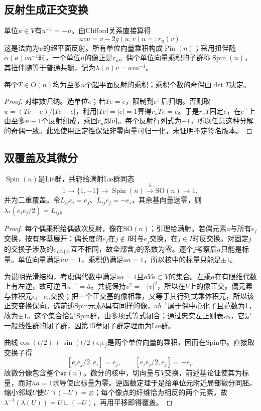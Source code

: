 \subsection{反射生成正交变换}
单位$u\in V$有$u^{-1}=-u$。由Clifford关系直接算得
\[
 uvu=v-2g(u,v)u=:r_u(v).
\]
这是法向为$u$的超平面反射。所有单位向量乘积构成$\operatorname{Pin}(n)$；采用扭伴随$\alpha(a)va^{-1}$时，一个单位$u$的像正是$r_u$。偶个单位向量乘积的子群称$\operatorname{Spin}(n)$，其扭伴随等于普通共轭，记为$\lambda(a)v=ava^{-1}$。

\begin{lemma}[正定反射分解]\label{lem:euclidean-reflections}
每个$T\in\mathrm O(n)$均为至多$n$个超平面反射的乘积；乘积个数的奇偶由$\det T$决定。
\end{lemma}
\begin{proof}
对维数归纳。选单位$e$；若$Te=e$，限制到$e^\perp$后归纳。否则取$u=(Te-e)/|Te-e|$，利用$|Te|=|e|=1$算得$r_uTe=e$。于是$r_uT$固定$e$，在$e^\perp$上由至多$n-1$个反射组成，乘回$r_u$即可。每个反射行列式为$-1$，所以任意这种分解的奇偶一致。此处使用正定性保证非零向量可归一化，未证明不定签名版本。
\end{proof}

\subsection{双覆盖及其微分}
\begin{theorem}\label{thm:spin-cover}
$\operatorname{Spin}(n)$是Lie群，共轭给满射Lie群同态
\[
 1\longrightarrow\{1,-1\}\longrightarrow\operatorname{Spin}(n)
 \xrightarrow{\lambda}\mathrm{SO}(n)\longrightarrow1,
\]
并为二重覆盖。令$L_{ij}e_i=e_j$、$L_{ij}e_j=-e_i$，其余基向量送零，则$\lambda_*(e_ie_j/2)=L_{ij}$。
\end{theorem}
\begin{proof}
每个偶乘积给偶数次反射，像在$\mathrm{SO}(n)$；引理给满射。若偶元素$a$与所有$e_j$交换，按有序基展开：偶长度的$e_I$在$j\notin I$时与$e_j$交换，在$j\in I$时反交换。对固定$j$的交换子涉及的$e_{I\triangle\{j\}}$互不相同，故全部含$j$的系数为零。逐个$j$考察后$a$只能是标量。单位向量满足$\bar u u=1$，乘积仍满足$\bar a a=1$，所以核中的标量只能是$\pm1$。

为说明光滑结构，考虑偶代数中满足$\bar a a=1$且$aV\bar a\subset V$的集合。左乘$a$在有限维代数上有左逆，故可逆且$a^{-1}=\bar a$。共轭保持$v^2=-|v|^2$，所以在$V$上的像正交。偶元素与体积元$e_1\cdots e_n$交换；把一个正交基的像相乘，又等于其行列式乘体积元，所以该正交变换保向。选前述Spin元素$b$具有同样的像，$ab^{-1}$属于偶中心化子且范数为1，故为$\pm1$。这个集合恰是Spin群，由多项式等式闭合；通过忠实左正则表示，它是一般线性群的闭子群，因第15章闭子群定理而为Lie群。

曲线$\cos(t/2)+\sin(t/2)e_ie_j$是两个单位向量的乘积，因而在Spin中。直接取交换子得
\[
 [e_ie_j/2,e_i]=e_j,\qquad [e_ie_j/2,e_j]=-e_i.
\]
故微分像包含整个$\mathfrak{so}(n)$。微分的核中，切向量与$V$交换，前述基论证使其为标量，而对$\bar a a=1$求导使此标量为零。逆函数定理于是给单位元附近局部微分同胚。缩小邻域$U$使$U\cap(-U)=\varnothing$；每个像点的纤维恰为相反的两个元素，故$\lambda^{-1}(\lambda(U))=U\sqcup(-U)$，再用平移即得覆盖。
\end{proof}

